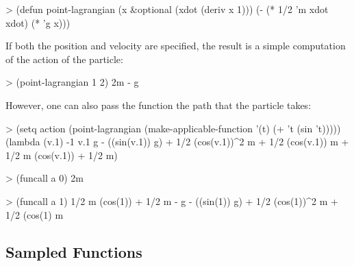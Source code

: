 \begin{code}
> (defun point-lagrangian (x &optional (xdot (deriv x 1)))
    (- (* 1/2 'm xdot xdot) (* 'g x)))
\end{code}
  
If both the position and velocity are specified, the result is a
simple computation of the action of the particle:
\begin{code}
> (point-lagrangian 1 2)
2m - g
\end{code}

\noindent
However, one can also pass the function the path
that the particle takes:
\begin{code}
> (setq action (point-lagrangian 
                 (make-applicable-function '(t) (+ 't (sin 't)))))
(lambda (v.1) -1 v.1 g - ((sin(v.1)) g) + 1/2 (cos(v.1))^2 m
   + 1/2 (cos(v.1)) m + 1/2 m (cos(v.1)) + 1/2 m)

> (funcall a 0)
2m

> (funcall a 1)
1/2 m (cos(1)) + 1/2 m - g - ((sin(1)) g) + 1/2 (cos(1))^2 m + 1/2 (cos(1) m
\end{code}


\subsection{Sampled Functions}
  

  



